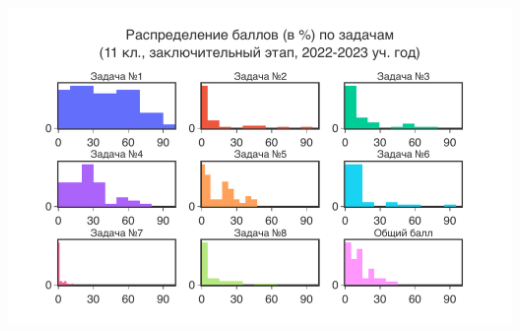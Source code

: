 \includegraphics[width=\linewidth]{../export/pdf/results/2023/respa/grade11-dist-problemwise.pdf}


